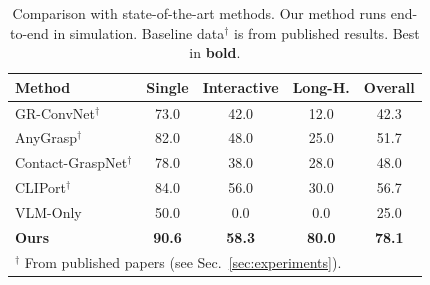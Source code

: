 \begin{table}[t]
\centering
\caption{Comparison with state-of-the-art methods. Our method runs
end-to-end in simulation. Baseline data$^\dagger$ is from published
results. Best in \textbf{bold}.}
\label{tab:sota}
\setlength{\tabcolsep}{3pt}
\begin{tabular}{@{}lcccc@{}}
\toprule
\textbf{Method} & \textbf{Single} & \textbf{Interactive} & \textbf{Long-H.} & \textbf{Overall} \\
\midrule
GR-ConvNet$^\dagger$ & 73.0 & 42.0 & 12.0 & 42.3 \\
AnyGrasp$^\dagger$ & 82.0 & 48.0 & 25.0 & 51.7 \\
Contact-GraspNet$^\dagger$ & 78.0 & 38.0 & 28.0 & 48.0 \\
CLIPort$^\dagger$ & 84.0 & 56.0 & 30.0 & 56.7 \\
VLM-Only & 50.0 & 0.0 & 0.0 & 25.0 \\
\midrule
\textbf{Ours} & \textbf{90.6} & \textbf{58.3} & \textbf{80.0} & \textbf{78.1} \\
\bottomrule
\multicolumn{5}{l}{\scriptsize $^\dagger$ From published papers (see Sec.~\ref{sec:experiments}).} \\
\end{tabular}
\end{table}